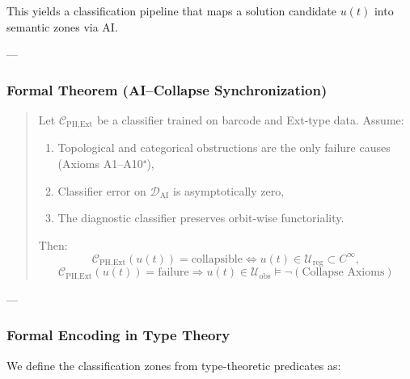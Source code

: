 \documentclass[11pt]{article}
\begin{document}
\begin{axiom}
\begin{axiom}
{{\begin{center}
\end{center}

This yields a classification pipeline that maps a solution candidate \( u(t) \) into semantic zones via AI.

---

\subsubsection*{Formal Theorem (AI–Collapse Synchronization)}

\begin{quote}
Let \( \mathcal{C}_{\text{PH,Ext}} \) be a classifier trained on barcode and Ext-type data.  
Assume:

\begin{enumerate}
  \item Topological and categorical obstructions are the only failure causes (Axioms A1–A10⁺),
  \item Classifier error on \(\mathcal{D}_{\text{AI}}\) is asymptotically zero,
  \item The diagnostic classifier preserves orbit-wise functoriality.
\end{enumerate}

Then:
\[
\mathcal{C}_{\text{PH,Ext}}(u(t)) = \text{collapsible} \Leftrightarrow u(t) \in \mathcal{U}_{\mathrm{reg}} \subset C^\infty,
\]
\[
\mathcal{C}_{\text{PH,Ext}}(u(t)) = \text{failure} \Rightarrow u(t) \in \mathcal{U}_{\mathrm{obs}} \models \neg(\text{Collapse Axioms})
\]
\end{quote}

---

\subsubsection*{Formal Encoding in Type Theory}

We define the classification zones from type-theoretic predicates as:

}}
\end{axiom}
\end{axiom}
\end{document}
